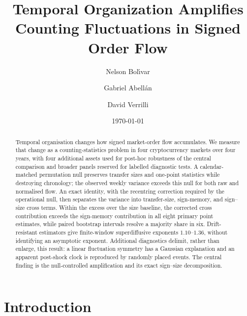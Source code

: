 \documentclass[aps,pre,twocolumn,superscriptaddress,floatfix,nofootinbib]{revtex4-2}
\begin{document}
\title{Temporal Organization Amplifies Counting Fluctuations in Signed Order Flow}

\author{Nelson Bol\'{\i}var}
\author{Gabriel Abell\'an}
\author{David Verrilli}
\date{\today}

\begin{abstract}
Temporal organisation changes how signed market-order flow accumulates. We
measure that change as a counting-statistics problem in four cryptocurrency
markets over four years, with four additional assets used for post-hoc
robustness of the central comparison and broader panels reserved for labelled
diagnostic tests. A calendar-matched permutation null preserves transfer sizes and
one-point statistics while destroying chronology; the observed weekly
variance exceeds this null for both raw and normalised flow. An exact identity,
with the recentring correction required by the operational null, then
separates the variance into transfer-size, sign-memory, and sign--size cross
terms. Within the excess over the size baseline, the corrected cross
contribution exceeds the sign-memory contribution in all eight primary point
estimates, while paired bootstrap intervals resolve a majority share in six.
Drift-resistant estimators give finite-window superdiffusive exponents
$1.10$--$1.36$, without identifying an asymptotic exponent. Additional
diagnostics delimit, rather than enlarge, this result: a linear fluctuation
symmetry has a Gaussian explanation and an apparent post-shock clock is
reproduced by randomly placed events. The central finding is the
null-controlled amplification and its exact sign--size decomposition.
\end{abstract}
\maketitle

\section{Introduction}
\end{document}
